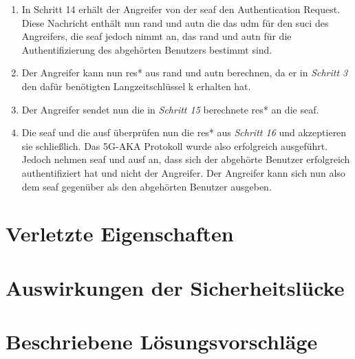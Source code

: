 \begin{enumerate}
\item In Schritt 14 erhält der Angreifer von der \gls{seaf} den Authentication Request.
Diese Nachricht enthält nun \gls{rand} und \gls{autn} die das \gls{udm} für den \gls{suci} des Angreifers, die \gls{seaf} jedoch nimmt an, das \gls{rand} und \gls{autn} für die Authentifizierung des abgehörten Benutzers bestimmt sind.

\item Der Angreifer kann nun \gls{res*} aus \gls{rand} und \gls{autn} berechnen, da er in \textit{Schritt 3} den dafür benötigten Langzeitschlüssel \gls{k} erhalten hat.

\item Der Angreifer sendet nun die in \textit{Schritt 15} berechnete \gls{res*} an die \gls{seaf}.

\item Die \gls{seaf} und die \gls{ausf} überprüfen nun die \gls{res*} aus \textit{Schritt 16} und akzeptieren sie schließlich.
Das 5G-AKA Protokoll wurde also erfolgreich ausgeführt.
Jedoch nehmen \gls{seaf} und \gls{ausf} an, dass sich der abgehörte Benutzer erfolgreich authentifiziert hat und nicht der Angreifer.
Der Angreifer kann sich nun also dem \gls{seaf} gegenüber als den abgehörten Benutzer ausgeben.

\end{enumerate}


\section{Verletzte Eigenschaften}

\section{Auswirkungen der Sicherheitslücke}

\section{Beschriebene Lösungsvorschläge}
